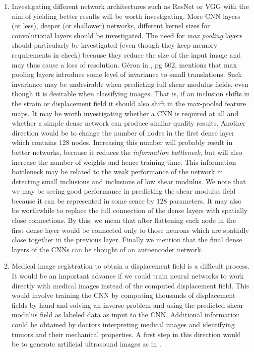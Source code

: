 \documentclass[12pt]{article}
\begin{document}
\begin{enumerate}
\item{Investigating different network architectures such as ResNet \cite{conf:resnet} or VGG \cite{conf:vgg} with the aim of yielding better results will be worth investigating. More CNN layers (or less), deeper (or shallower) networks, different kernel sizes for convolutional layers should be investigated. The need for \textit{max pooling} layers should particularly be investigated (even though they keep memory requirements in check) because they reduce the size of the input image and may thus cause a loss of resolution. G\'{e}ron in \cite{book:geron2019}, pg 602, mentions that max pooling layers introduce some level of invariance to small translations. Such invariance may be undesirable when predicting full shear modulus fields, even though it is desirable when classifying images. That is, if an inclusion shifts in the strain or displacement field it should also shift in the max-pooled feature maps. It may be worth investigating whether a CNN is required at all and whether a simple dense network can produce similar quality results. Another direction would be to change the number of nodes in the first dense layer which contains $128$ nodes. Increasing this number will probably result in better networks, because it reduces the \textit{information bottleneck}\cite{book:chollet}, but will also increase the number of weights and hence training time. This information bottleneck may be related to the weak performance of the network in detecting small inclusions and inclusions of low shear modulus. We note that we may be seeing good performance in predicting the shear modulus field because it can be represented in some sense by $128$ parameters. It may also be worthwhile to replace the full connection of the dense layers with spatially close connections. By this, we mean that after flattening each node in the first dense layer would be connected only to those neurons which are spatially close together in the previous layer. Finally we mention that the final dense layers of the CNNs can be thought of an autoencoder network.}
\item{Medical image registration to obtain a displacement field is a difficult process. It would be an important advance if we could train neural networks to work directly with medical images instead of the computed displacement field. This would involve training the CNN by computing thousands of displacement fields by hand and solving an inverse problem and using the predicted shear modulus field as labeled data as input to the CNN. Additional information could be obtained by doctors interpreting medical images and identifying tumors and their mechanical properties. A first step in this direction would be to generate artificial ultrasound images as in \cite{paper:doyley}.}

\end{enumerate}
\end{document}
